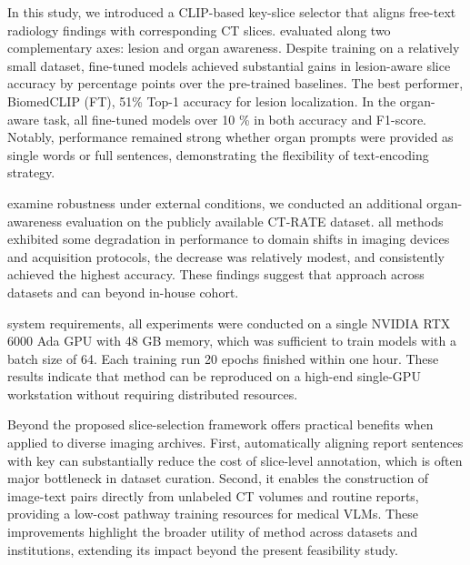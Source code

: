 \documentclass[bioengineering,article,submit,pdftex,moreauthors]{Definitions/mdpi}
\begin{document}
In this study, we introduced a CLIP-based key-slice selector that aligns free-text radiology findings with corresponding CT slices. 
 evaluated along two complementary axes: lesion and organ awareness. 
Despite training on a relatively small dataset, fine-tuned models achieved substantial gains in lesion-aware slice  accuracy by  percentage points over the pre-trained baselines. 
The best performer, BiomedCLIP (FT),  51\% Top-1 accuracy for lesion localization. 
In the organ-aware task, all fine-tuned models  over 10 \% in both accuracy and F1-score. 
Notably, performance remained strong whether organ prompts were provided as single words or full sentences, demonstrating the flexibility of  text-encoding strategy. 

    examine robustness under external conditions, we conducted an additional organ-awareness evaluation on the publicly available CT-RATE dataset. 
   all methods exhibited some degradation in performance  to domain shifts in imaging devices and acquisition protocols, the decrease was relatively modest, and  consistently achieved the highest accuracy. 
  These findings suggest that  approach   across datasets and can  beyond  in-house cohort.



   system requirements, all experiments were conducted on a single NVIDIA RTX 6000 Ada GPU with 48 GB memory, which was sufficient to train models with a batch size of 64. 
  Each training run  20 epochs finished within one hour. 
  These results indicate that  method can be reproduced on a high-end single-GPU workstation without requiring distributed resources.



  Beyond    the proposed slice-selection framework offers practical benefits when applied to diverse imaging archives. 
  First, automatically aligning report sentences with key  can substantially reduce the cost of  slice-level annotation, which is often  major bottleneck in dataset curation. 
  Second, it enables the construction of image-text pairs directly from unlabeled CT volumes and routine reports, providing a low-cost pathway   training resources for medical VLMs. 
  These improvements highlight the broader utility of  method across datasets and institutions, extending its impact beyond the present feasibility study.
\end{document}
